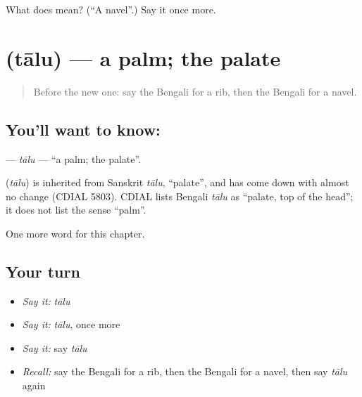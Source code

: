 \begin{tcolorbox}[breakable,colback=teal!4,colframe=teal!35!black,title={Before you move on}]
What does  mean? (\textquotedblleft{}A navel\textquotedblright{}.) Say it once more.
\end{tcolorbox}
\section[\texorpdfstring{\bn{তালু} (tālu)}{তালু (tālu)}]{ (tālu) — a palm; the palate}

\label{lesson:BN-C186-talu}



\begin{quote}
Before the new one: say the Bengali for a rib, then the Bengali for a navel.
\end{quote}

\subsection*{You'll want to know: }
\textbf{} — \emph{tālu} — \textquotedblleft{}a palm; the palate\textquotedblright{}.

\begin{cousinweb}
\textbf{} (\emph{tālu}) is inherited from Sanskrit \emph{tālu}, \textquotedblleft{}palate\textquotedblright{}, and has come down with almost no change (CDIAL 5803). CDIAL lists Bengali \emph{tālu} as \textquotedblleft{}palate, top of the head\textquotedblright{}; it does not list the sense \textquotedblleft{}palm\textquotedblright{}.
\end{cousinweb}

\begin{grammarlens}[title={What you've built}]
One more word for this chapter.
\end{grammarlens}

\subsection*{Your turn}
\begin{itemize}
\raggedright
  \item \emph{Say it:} \emph{tālu}
  \item \emph{Say it:} \emph{tālu}, once more
  \item \emph{Say it:} say \emph{tālu}
  \item \emph{Recall:} say the Bengali for a rib, then the Bengali for a navel, then say \emph{tālu} again
\end{itemize}

